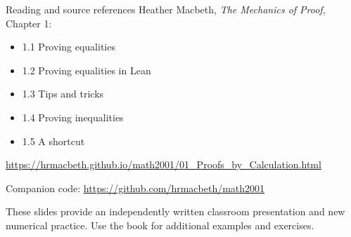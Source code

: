 \begin{frame}{Reading and source references}
Heather Macbeth, \emph{The Mechanics of Proof}, Chapter 1:
\begin{itemize}
\item 1.1 Proving equalities
\item 1.2 Proving equalities in Lean
\item 1.3 Tips and tricks
\item 1.4 Proving inequalities
\item 1.5 A shortcut
\end{itemize}
\small
\url{https://hrmacbeth.github.io/math2001/01_Proofs_by_Calculation.html}
\par\medskip
Companion code: \url{https://github.com/hrmacbeth/math2001}
\par\medskip
These slides provide an independently written classroom presentation and new numerical practice.
Use the book for additional examples and exercises.
\end{frame}

